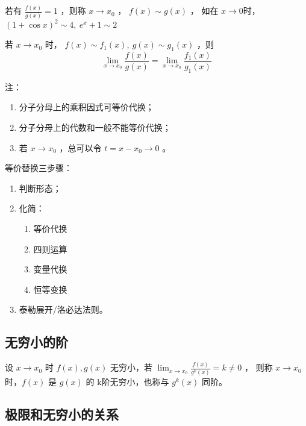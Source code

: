 \begin{Field}[广义等价]

    若有 $ \displaystyle\frac{f(x)}{g(x)}=1 $ ，则称 $ x\rightarrow x_0 $ ， $ f(x)\sim g(x) $ ，
    如在 $ x\rightarrow0 $时，  $ (1+\cos x)^2 \sim 4,\ e^x+1\sim 2$
\end{Field}

\begin{Def}[广义等价替换定理]

    若 $ x\rightarrow x_0 $ 时， $ f(x)\sim f_1(x),\ g(x)\sim g_1(x) $ ，则$$
        \lim_{x\rightarrow x_0}\frac{f(x)}{g(x)}=\lim_{x\rightarrow x_0}\frac{f_1(x)}{g_1(x)}
    $$ 
\end{Def}

注：
\begin{enumerate}
    \item 分子分母上的乘积因式可等价代换；
    \item 分子分母上的代数和一般不能等价代换；
    \item 若 $ x\rightarrow x_0 $ ，总可以令 $ t=x-x_0\rightarrow0 $ 。
\end{enumerate}

等价替换三步骤：
\begin{enumerate}
    \item 判断形态；
    \item 化简：
    \begin{enumerate}
        \item 等价代换
        \item 四则运算
        \item 变量代换
        \item 恒等变换
    \end{enumerate}
    \item 泰勒展开/洛必达法则。
\end{enumerate}

\subsection{无穷小的阶}

\begin{Def}[无穷小阶的定义]

    设 $ x\rightarrow x_0 $ 时 $ f(x),g(x) $ 无穷小，若
    $ \displaystyle\lim_{x\rightarrow x_0}\frac{f(x)}{g^k(x)}=k\neq0 $ ，
    则称 $ x\rightarrow x_0 $ 时，$ f(x) $ 是 $ g(x) $ 的 k阶无穷小，也称与 $ g^k(x) $ 同阶。
\end{Def}

\subsection{极限和无穷小的关系}

